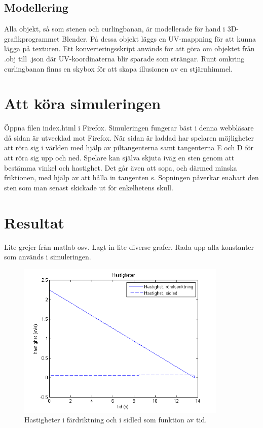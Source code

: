 \documentclass[11pt]{article} %
\begin{document}
\subsection{Modellering}
Alla objekt, så som stenen och curlingbanan, är modellerade för hand i 3D-grafikprogrammet Blender. På dessa objekt läggs en UV-mappning för att kunna lägga på texturen. Ett konverteringsskript används för att göra om objektet från .obj till .json där UV-koordinaterna blir sparade som strängar. Runt omkring curlingbanan finns en skybox för att skapa illusionen av en stjärnhimmel.

\section{Att köra simuleringen}
Öppna filen index.html i Firefox. Simuleringen fungerar bäst i denna webbläsare då sidan är utvecklad mot Firefox. När sidan är laddad har spelaren möjligheter att röra sig i världen med hjälp av piltangenterna samt tangenterna E och D för att röra sig upp och ned. Spelare kan själva skjuta iväg en sten genom att bestämma vinkel och hastighet. Det går även att sopa, och därmed minska friktionen, med hjälp av att hålla in tangenten s. Sopningen påverkar enabart den sten som man senast skickade ut för enkelhetens skull. 

\pagebreak
\section{Resultat}

Lite grejer från matlab osv. 
Lagt in lite diverse grafer.
Rada upp alla konstanter som används i simuleringen. 

\begin{figure}[ht!]
\centering
\includegraphics[width=100mm]{hastigheter_tid_graf.png}
\caption{Hastigheter i färdriktning och i sidled som funktion av tid.}
\label{fig:hast_graf}
\label{overflow}
\end{figure}
\end{document}
